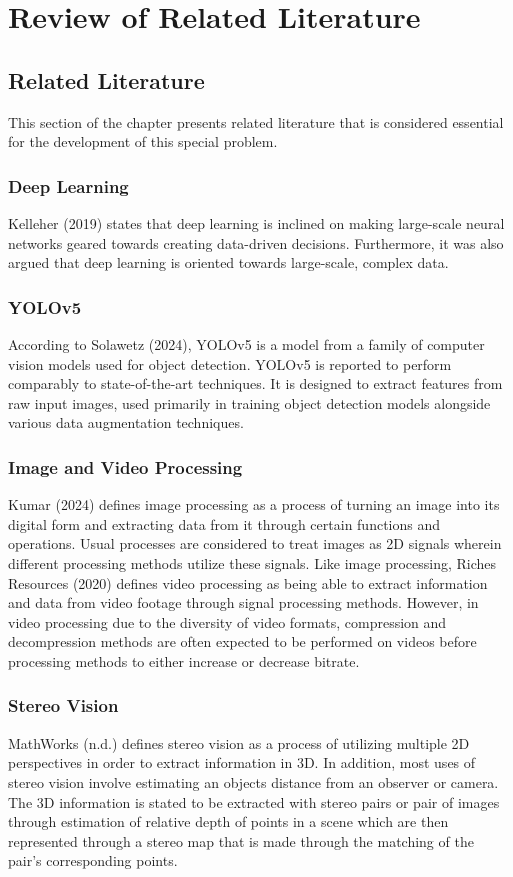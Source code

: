 \chapter{Review of Related Literature}

\section{Related Literature}
This section of the chapter presents related literature that is considered essential for the development of this special problem.

\subsection{Deep Learning}
Kelleher (2019) states that deep learning is inclined on making large-scale neural networks geared towards creating data-driven decisions. Furthermore, it was also argued that deep learning is oriented towards large-scale, complex data.

\subsection{YOLOv5}
According to Solawetz (2024), YOLOv5 is a model from a family of computer vision models used for object detection. YOLOv5 is reported to perform comparably to state-of-the-art techniques. It is designed to extract features from raw input images, used primarily in training object detection models alongside various data augmentation techniques.

\subsection{Image and Video Processing}
Kumar (2024) defines image processing as a process of turning an image into its digital form and extracting data from it through certain functions and operations. Usual processes are considered to treat images as 2D signals wherein different processing methods utilize these signals.
Like image processing, Riches Resources (2020) defines video processing as being able to extract information and data from video footage through signal processing methods. However, in video processing due to the diversity of video formats, compression and decompression methods are often expected to be performed on videos before processing methods to either increase or decrease bitrate.

\subsection{Stereo Vision}
MathWorks (n.d.) defines stereo vision as a process of utilizing multiple 2D perspectives in order to extract information in 3D. In addition, most uses of stereo vision involve estimating an objects distance from an observer or camera. The 3D information is stated to be extracted with stereo pairs or pair of images through estimation of relative depth of points in a scene which are then represented through a stereo map that is made through the matching of the pair's corresponding points.


